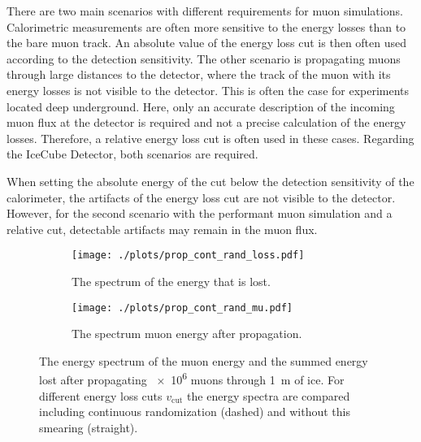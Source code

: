 There are two main scenarios with different requirements for muon simulations.
Calorimetric measurements are often more sensitive to the energy losses than to the bare muon track.
An absolute value of the energy loss cut is then often used according to the detection sensitivity.
The other scenario is propagating muons through large distances to the detector, where the track of the muon with its energy losses is not visible to the detector.
This is often the case for experiments located deep underground.
Here, only an accurate description of the incoming muon flux at the detector is required and not a precise calculation of the energy losses.
Therefore, a relative energy loss cut is often used in these cases.
Regarding the IceCube Detector, both scenarios are required.

When setting the absolute energy of the cut below the detection sensitivity of the calorimeter, the artifacts of the energy loss cut are not visible to the detector.
However, for the second scenario with the performant muon simulation and a relative cut, detectable artifacts may remain in the muon flux.
\begin{figure}
    \centering
    \begin{subfigure}{0.9\textwidth}
        \centering
        \texttt{[image: ./plots/prop\_cont\_rand\_loss.pdf]}
        \caption{The spectrum of the energy that is lost.}
        \label{fig:cont_rand_loss}
        \vspace{0.5cm}
    \end{subfigure}
    \begin{subfigure}{0.9\textwidth}
        \centering
        \texttt{[image: ./plots/prop\_cont\_rand\_mu.pdf]}
        \caption{The spectrum muon energy after propagation.}
        \label{fig:cont_rand_mu}
    \end{subfigure}
    \caption{The energy spectrum of the muon energy and the summed energy lost after propagating \num{e6} muons through \SI{1}{m} of ice. For different energy loss cuts $v_{\text{cut}}$ the energy spectra are compared including continuous randomization (dashed) and without this smearing (straight).}
    \label{fig:cont_rand}
\end{figure}

